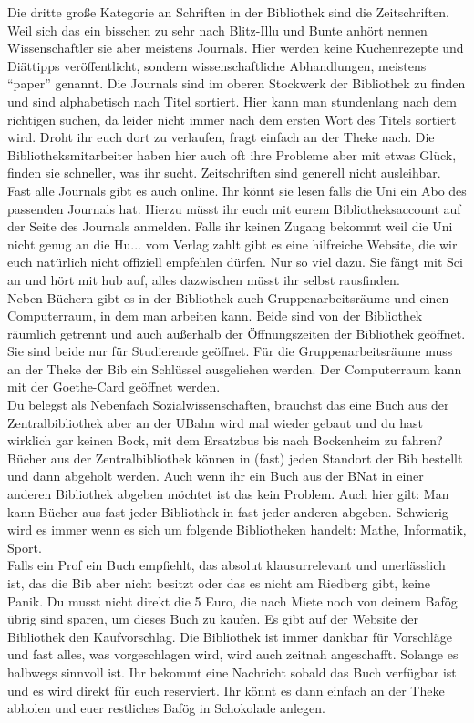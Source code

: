 Die dritte gro\ss e Kategorie an Schriften in der Bibliothek sind die Zeitschriften. Weil sich das ein bisschen zu sehr nach Blitz-Illu und Bunte anhört nennen Wissenschaftler sie aber meistens Journals. Hier werden keine Kuchenrezepte und Diättipps veröffentlicht, sondern wissenschaftliche Abhandlungen, meistens \enquote{paper} genannt. Die Journals sind im oberen Stockwerk der Bibliothek zu finden und sind alphabetisch nach Titel sortiert. Hier kann man stundenlang nach dem richtigen suchen, da leider nicht immer nach dem ersten Wort des Titels sortiert wird. Droht ihr euch dort zu verlaufen, fragt einfach an der Theke nach. Die Bibliotheksmitarbeiter haben hier auch oft ihre Probleme aber mit etwas Glück, finden sie schneller, was ihr sucht. Zeitschriften sind generell nicht ausleihbar. Fast alle Journals gibt es auch online. Ihr könnt sie lesen falls die Uni ein Abo des passenden Journals hat. Hierzu müsst ihr euch mit eurem Bibliotheksaccount auf der Seite des Journals anmelden. Falls ihr keinen Zugang bekommt weil die Uni nicht genug an die Hu... vom Verlag zahlt gibt es eine hilfreiche Website, die wir euch natürlich nicht offiziell empfehlen dürfen. Nur so viel dazu. Sie fängt mit Sci an und hört mit hub auf, alles dazwischen müsst ihr selbst rausfinden.\\
Neben Büchern gibt es in der Bibliothek auch Gruppenarbeitsräume und einen Computerraum, in dem man arbeiten kann. Beide sind von der Bibliothek räumlich getrennt und auch au\ss erhalb der Öffnungszeiten der Bibliothek geöffnet. Sie sind beide nur für Studierende geöffnet. Für die Gruppenarbeitsräume muss an der Theke der Bib ein Schlüssel ausgeliehen werden. Der Computerraum kann mit der Goethe-Card geöffnet werden.\\
Du belegst als Nebenfach Sozialwissenschaften, brauchst das eine Buch aus der Zentralbibliothek aber an der UBahn wird mal wieder gebaut und du hast wirklich gar keinen Bock, mit dem Ersatzbus bis nach Bockenheim zu fahren? Bücher aus der Zentralbibliothek können in (fast) jeden Standort der Bib bestellt und dann abgeholt werden. Auch wenn ihr ein Buch aus der BNat in einer anderen Bibliothek abgeben möchtet ist das kein Problem. Auch hier gilt: Man kann Bücher aus fast jeder Bibliothek in fast jeder anderen abgeben. Schwierig wird es immer wenn es sich um folgende Bibliotheken handelt: Mathe, Informatik, Sport.\\
Falls ein Prof ein Buch empfiehlt, das absolut klausurrelevant und unerlässlich ist, das die Bib aber nicht besitzt oder das es nicht am Riedberg gibt, keine Panik. Du musst nicht direkt die 5 Euro, die nach Miete noch von deinem Bafög übrig sind sparen, um dieses Buch zu kaufen. Es gibt auf der Website der Bibliothek den Kaufvorschlag. Die Bibliothek ist immer dankbar für Vorschläge und fast alles, was vorgeschlagen wird, wird auch zeitnah angeschafft. Solange es halbwegs sinnvoll ist. Ihr bekommt eine Nachricht sobald das Buch verfügbar ist und es wird direkt für euch reserviert. Ihr könnt es dann einfach an der Theke abholen und euer restliches Bafög in Schokolade anlegen.\\

